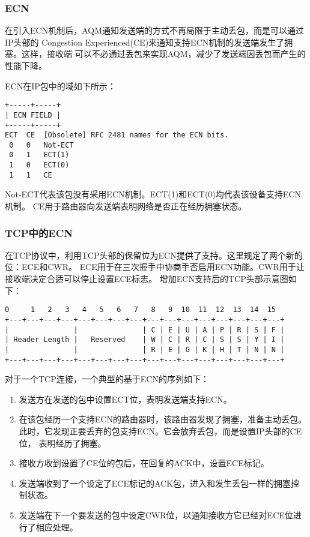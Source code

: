 \subsubsection{ECN}
\label{subsubsec:ecn}
在引入ECN机制后，AQM通知发送端的方式不再局限于主动丢包，而是可以通过IP头部的
Congestion Experienced(CE)来通知支持ECN机制的发送端发生了拥塞。这样，接收端
可以不必通过丢包来实现AQM，减少了发送端因丢包而产生的性能下降。

ECN在IP包中的域如下所示：
\begin{verbatim}
+-----+-----+ 
| ECN FIELD | 
+-----+-----+ 
ECT  CE  [Obsolete] RFC 2481 names for the ECN bits. 
 0   0   Not-ECT 
 0   1   ECT(1) 
 1   0   ECT(0) 
 1   1   CE
\end{verbatim}

Not-ECT代表该包没有采用ECN机制。ECT(1)和ECT(0)均代表该设备支持ECN机制。
CE用于路由器向发送端表明网络是否正在经历拥塞状态。

\subsubsection{TCP中的ECN}
在TCP协议中，利用TCP头部的保留位为ECN提供了支持。这里规定了两个新的位：ECE和CWR。
ECE用于在三次握手中协商手否启用ECN功能。CWR用于让接收端决定合适可以停止设置ECE标志。
增加ECN支持后的TCP头部示意图如下：
\begin{verbatim}
0     1   2   3   4   5   6   7   8   9  10  11  12  13  14  15 
+---+---+---+---+---+---+---+---+---+---+---+---+---+---+---+---+ 
|               |               | C | E | U | A | P | R | S | F | 
| Header Length |   Reserved    | W | C | R | C | S | S | Y | I | 
|               |               | R | E | G | K | H | T | N | N | 
+---+---+---+---+---+---+---+---+---+---+---+---+---+---+---+---+
\end{verbatim}

对于一个TCP连接，一个典型的基于ECN的序列如下：
\begin{enumerate}
  \item 发送方在发送的包中设置ECT位，表明发送端支持ECN。
  \item 在该包经历一个支持ECN的路由器时，该路由器发现了拥塞，准备主动丢包。
    此时，它发现正要丢弃的包支持ECN。它会放弃丢包，而是设置IP头部的CE位，
    表明经历了拥塞。
  \item 接收方收到设置了CE位的包后，在回复的ACK中，设置ECE标记。
  \item 发送端收到了一个设定了ECE标记的ACK包，进入和发生丢包一样的拥塞控制状态。
  \item 发送端在下一个要发送的包中设定CWR位，以通知接收方它已经对ECE位进行了相应处理。
\end{enumerate}

